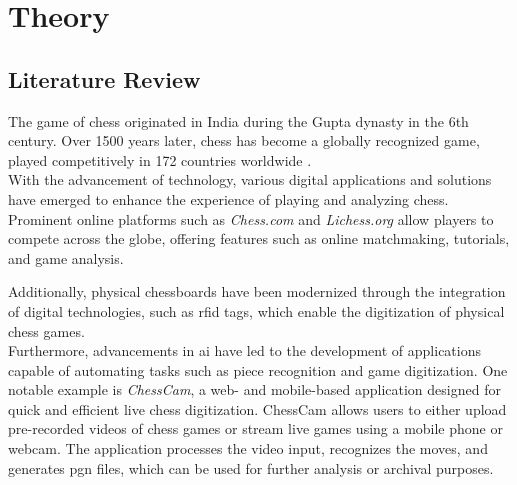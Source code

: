 \chapter{Theory}

\section{Literature Review}

The game of chess originated in India during the Gupta dynasty in the 6th century. Over 1500 years later, chess has become a globally recognized game, played competitively in 172 countries worldwide \cite{artsnculture}. \\

With the advancement of technology, various digital applications and solutions have emerged to enhance the experience of playing and analyzing chess. Prominent online platforms such as \textit{Chess.com} and \textit{Lichess.org} allow players to compete across the globe, offering features such as online matchmaking, tutorials, and game analysis. 

Additionally, physical chessboards have been modernized through the integration of digital technologies, such as \gls{rfid} tags, which enable the digitization of physical chess games. \cite{quora:shah} \\

Furthermore, advancements in \gls{ai} have led to the development of applications capable of automating tasks such as piece recognition and game digitization. One notable example is \textit{ChessCam}, a web- and mobile-based application designed for quick and efficient live chess digitization. ChessCam allows users to either upload pre-recorded videos of chess games or stream live games using a mobile phone or webcam. The application processes the video input, recognizes the moves, and generates \gls{pgn} files, which can be used for further analysis or archival purposes.


